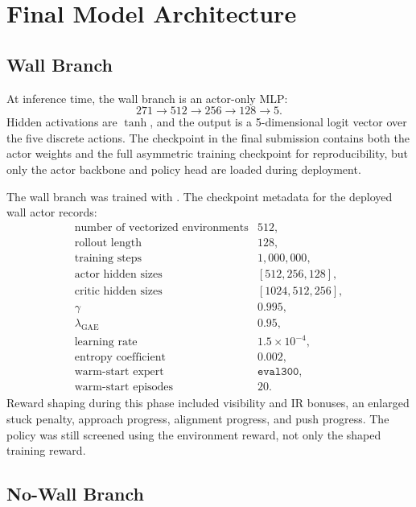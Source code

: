 \documentclass[11pt]{article}
\begin{document}
\section{Final Model Architecture}

\subsection{Wall Branch}

At inference time, the wall branch is an actor-only MLP:
\[
  271 \rightarrow 512 \rightarrow 256 \rightarrow 128 \rightarrow 5.
\]
Hidden activations are \(\tanh\), and the output is a 5-dimensional logit vector over the
five discrete actions. The checkpoint in the final submission contains both the actor
weights and the full asymmetric training checkpoint for reproducibility, but only the
actor backbone and policy head are loaded during deployment.

The wall branch was trained with . The checkpoint
metadata for the deployed wall actor records:
\[
\begin{array}{ll}
\text{number of vectorized environments} & 512,\\
\text{rollout length} & 128,\\
\text{training steps} & 1{,}000{,}000,\\
\text{actor hidden sizes} & [512,256,128],\\
\text{critic hidden sizes} & [1024,512,256],\\
\gamma & 0.995,\\
\lambda_{\text{GAE}} & 0.95,\\
\text{learning rate} & 1.5\times 10^{-4},\\
\text{entropy coefficient} & 0.002,\\
\text{warm-start expert} & \texttt{eval300},\\
\text{warm-start episodes} & 20.
\end{array}
\]
Reward shaping during this phase included visibility and IR bonuses, an enlarged stuck
penalty, approach progress, alignment progress, and push progress. The policy was still
screened using the environment reward, not only the shaped training reward.

\subsection{No-Wall Branch}
\end{document}
